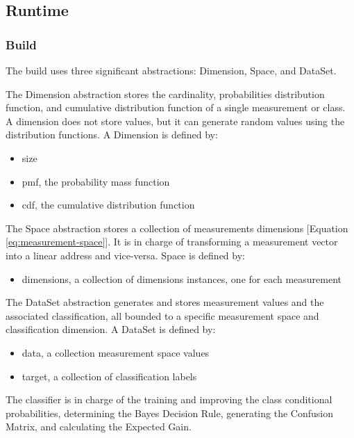 \documentclass[letterpaper, conference]{IEEEtran}
\begin{document}
\subsection{Runtime}

\subsubsection{Build}

The build uses three significant abstractions: Dimension, Space, and DataSet.

The Dimension abstraction stores the cardinality, probabilities distribution function, and cumulative distribution function of a single measurement or class. A dimension does not store values, but it can generate random values using the distribution functions. A Dimension is defined by:

\begin{itemize}
  \item size
  \item pmf, the probability mass function
  \item cdf, the cumulative distribution function
\end{itemize}

The Space abstraction stores a collection of measurements dimensions [Equation \ref{eq:measurement-space}]. It is in charge of transforming a measurement vector into a linear address and vice-versa. Space is defined by:

\begin{itemize}
  \item dimensions, a collection of dimensions instances, one for each measurement
\end{itemize}

The DataSet abstraction generates and stores measurement values and the associated classification, all bounded to a specific measurement space and classification dimension. A DataSet is defined by:

\begin{itemize}
  \item data, a collection measurement space values
  \item target, a collection of classification labels
\end{itemize}

The classifier is in charge of the training and improving the class conditional probabilities, determining the Bayes Decision Rule, generating the Confusion Matrix, and calculating the Expected Gain.
\end{document}
